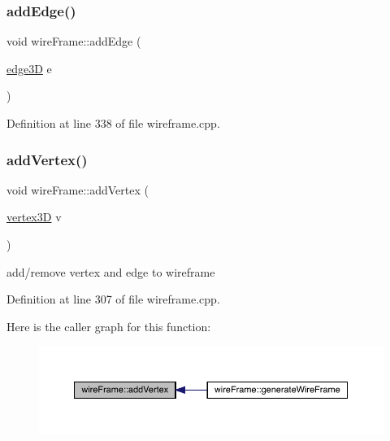 \subsubsection{\texorpdfstring{add\+Edge()}{addEdge()}\hspace{0.1cm}{\footnotesize\ttfamily [2/2]}}
{\footnotesize\ttfamily void wire\+Frame\+::add\+Edge (\begin{DoxyParamCaption}\item[{\mbox{\hyperlink{structedge3_d}{edge3D}}}]{e }\end{DoxyParamCaption})}



Definition at line 338 of file wireframe.\+cpp.

\mbox{\label{classwire_frame_ae4675da9bff33c6b78b9c0036f6f5b0e}} 
\subsubsection{\texorpdfstring{add\+Vertex()}{addVertex()}}
{\footnotesize\ttfamily void wire\+Frame\+::add\+Vertex (\begin{DoxyParamCaption}\item[{\mbox{\hyperlink{structvertex3_d}{vertex3D}}}]{v }\end{DoxyParamCaption})}

add/remove vertex and edge to wireframe 

Definition at line 307 of file wireframe.\+cpp.

Here is the caller graph for this function\+:
\nopagebreak
\begin{figure}[H]
\begin{center}
\leavevmode
\includegraphics[width=350pt]{classwire_frame_ae4675da9bff33c6b78b9c0036f6f5b0e_icgraph}
\end{center}
\end{figure}
\mbox{\label{classwire_frame_ae67d78b40bd171b508f9d5575121aab6}} 
